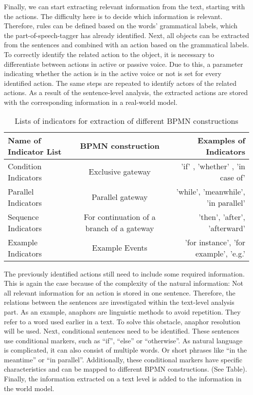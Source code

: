 Finally, we can start extracting relevant information from the text, starting with the actions. The difficulty here is to decide which information is relevant. Therefore, rules can be defined based on the words’ grammatical labels, which the part-of-speech-tagger has already identified. Next, all objects can be extracted from the sentences and combined with an action based on the grammatical labels. To correctly identify the related action to the object, it is necessary to differentiate between actions in active or passive voice. Due to this, a parameter indicating whether the action is in the active voice or not is set for every identified action. The same steps are repeated to identify actors of the related actions.
As a result of the sentence-level analysis, the extracted actions are stored with the corresponding information in a real-world model. 
\begin{table}[H]
  \begin{center}
    \caption{Lists of indicators for extraction of different BPMN constructions}
    \label{tab:table1}
    \begin{tabular}{l|c|r} %
      \textbf{Name of Indicator List} & \textbf{BPMN construction} & \textbf{Examples of Indicators}\\
      \hline
      Condition Indicators & Exclusive gateway & 'if' , 'whether' , 'in case of'\\
      Parallel Indicators & Parallel gateway & 'while', 'meanwhile', 'in parallel'\\
      Sequence Indicators &  For continuation of a branch of a gateway &'then', 'after', 'afterward' \\
      Example Indicators & Example Events & 'for instance', 'for example', 'e.g.' \\
    \end{tabular}
  \end{center}
\end{table}
The previously identified actions still need to include some required information. This is again the case because of the complexity of the natural information: Not all relevant information for an action is stored in one sentence. Therefore, the relations between the sentences are investigated within the text-level analysis part. As an example, anaphors are linguistic methods to avoid repetition. They refer to a word used earlier in a text. To solve this obstacle, anaphor resolution will be used. Next, conditional sentences need to be identified. These sentences use conditional markers, such as “if”, “else” or “otherwise”. As natural language is complicated, it can also consist of multiple words. Or short phrases like “in the meantime” or “in parallel”.
Additionally, these conditional markers have specific characteristics and can be mapped to different BPMN constructions. (See Table). Finally, the information extracted on a text level is added to the information in the world model.


